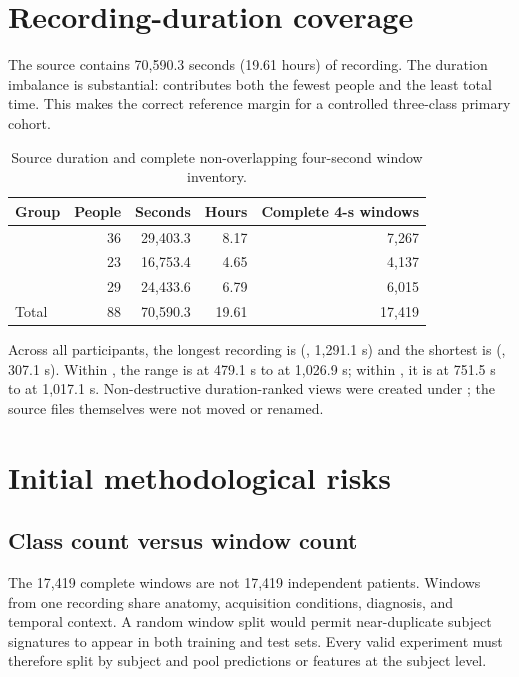 \section{Recording-duration coverage}

The source contains 70,590.3 seconds (19.61 hours) of recording. The duration
imbalance is substantial: \FTD{} contributes both the fewest people and the
least total time. This makes \FTD{} the correct reference margin for a controlled
three-class primary cohort.

\begin{table}[htbp]
\centering
\begin{tabular}{lrrrr}
\toprule
\textbf{Group} & \textbf{People} & \textbf{Seconds} & \textbf{Hours} & \textbf{Complete 4-s windows}\\
\midrule
\AD{} & 36 & 29,403.3 & 8.17 & 7,267\\
\FTD{} & 23 & 16,753.4 & 4.65 & 4,137\\
\CN{} & 29 & 24,433.6 & 6.79 & 6,015\\
\midrule
Total & 88 & 70,590.3 & 19.61 & 17,419\\
\bottomrule
\end{tabular}
\caption{Source duration and complete non-overlapping four-second window inventory.}
\label{tab:duration-source}
\end{table}

Across all participants, the longest recording is  (\AD{},
1,291.1 s) and the shortest is  (\AD{}, 307.1 s). Within \FTD{},
the range is  at 479.1 s to  at 1,026.9 s; within
\CN{}, it is  at 751.5 s to  at 1,017.1 s.
Non-destructive duration-ranked views were created under
; the source files themselves were not
moved or renamed.



\section{Initial methodological risks}

\subsection{Class count versus window count}

The 17,419 complete windows are not 17,419 independent patients. Windows from
one recording share anatomy, acquisition conditions, diagnosis, and temporal
context. A random window split would permit near-duplicate subject signatures
to appear in both training and test sets. Every valid experiment must therefore
split by subject and pool predictions or features at the subject level.

